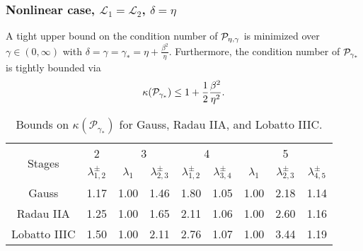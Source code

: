 \documentclass[blue]{beamer}
\begin{document}
%
\begin{frame}
\frametitle{Nonlinear case, $\mathcal{L}_1=\mathcal{L}_2$, $\delta = \eta$}

\begin{corollary}[Optimal preconditioning with $\gamma = \delta$]
A tight upper bound on the condition number of ${\cal P}_{\eta,\gamma}$
is minimized over $\gamma \in (0, \infty)$ with $\delta = \gamma = 
\gamma_* =  \eta + \frac{\beta^2}{\eta}$.
Furthermore, the condition number of ${\cal P}_{\gamma_*}$
is tightly bounded via
\begin{align*}
\kappa({\cal P}_{\gamma_*}) \leq 1 +  \frac{1}{2} \frac{\beta^2}{\eta^2}.
\end{align*}
\end{corollary}

{
\renewcommand{\tabcolsep}{3pt}
\renewcommand{\arraystretch}{1.15}
\begin{table}[!ht]
  \centering
  \begin{tabular}{| c | c | cc | cc | ccc |}  %
  \hline
\multirow{2}{*}{Stages} & 2 & \multicolumn{2}{c}{3} & \multicolumn{2}{|c}{4} & \multicolumn{3}{|c|}{5} \\

& {$\lambda_{1,2}^\pm$} & {$\lambda_1$} & {$\lambda_{2,3}^\pm$} & {$\lambda_{1,2}^\pm$} &
    {$\lambda_{3,4}^\pm$} & {$\lambda_1$} & {$\lambda_{2,3}^\pm$} & {$\lambda_{4,5}^\pm$} \\
\hline
Gauss  & 1.17 & 1.00 & 1.46 & 1.80 & 1.05 & 1.00 & 2.18 & 1.14 \\
Radau IIA  & 1.25 & 1.00 & 1.65 & 2.11 & 1.06 & 1.00 & 2.60 & 1.16 \\
Lobatto IIIC & 1.50 & 1.00 & 2.11 & 2.76 & 1.07 & 1.00 & 3.44 & 1.19 \\\hline
  \end{tabular}
  \caption{Bounds on $\kappa(\mathcal{P}_{\gamma_*})$ for Gauss, Radau IIA,
  and Lobatto IIIC.}
\end{table}
}

\end{frame}
\end{document}
